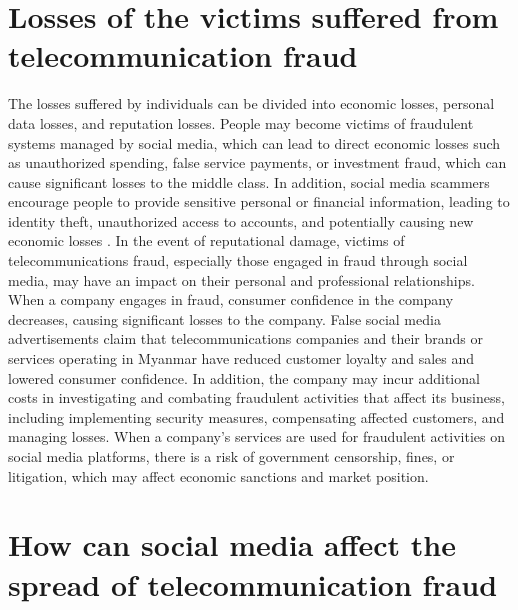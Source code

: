 \documentclass[man,floatsintext]{apa7}
\begin{document}
\section{Losses of the victims suffered from telecommunication fraud}

The losses suffered by individuals can be divided into economic losses, personal data losses, and reputation losses. People may become victims of fraudulent systems managed by social media, which can lead to direct economic losses such as unauthorized spending, false service payments, or investment fraud, which can cause significant losses to the middle class. In addition, social media scammers encourage people to provide sensitive personal or financial information, leading to identity theft, unauthorized access to accounts, and potentially causing new economic losses \autocite{huangCausesPreventionTelecommunication2018}.  In the event of reputational damage, victims of telecommunications fraud, especially those engaged in fraud through social media, may have an impact on their personal and professional relationships. When a company engages in fraud, consumer confidence in the company decreases, causing significant losses to the company. False social media advertisements claim that telecommunications companies and their brands or services operating in Myanmar have reduced customer loyalty and sales and lowered consumer confidence. In addition, the company may incur additional costs in investigating and combating fraudulent activities that affect its business, including implementing security measures, compensating affected customers, and managing losses. When a company's services are used for fraudulent activities on social media platforms, there is a risk of government censorship, fines, or litigation, which may affect economic sanctions and market position.

\section{How can social media affect the spread of telecommunication fraud}
\end{document}
